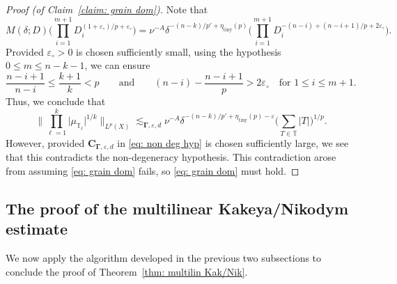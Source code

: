 \documentclass[reqno]{amsart}
\numberwithin{equation}{section}
\newcommand{\T}{\mathbb{T}}
\newcommand{\bC}{\mathbf{C}}
\newcommand{\bdGamma}{\boldsymbol{\Gamma}}
\theoremstyle{plain}
\theoremstyle{definition}
\newcommand{\ttiny}{\mathrm{tiny}}
\begin{document}
\begin{proof}[Proof (of Claim~\ref{claim: grain dom})]
Note that
\begin{equation*}
  M(\delta; D)\big(\prod_{i=1}^{m+1}  D_i^{(1 + \varepsilon_{\circ})/p + \varepsilon_{\circ}}\Big)  =    \nu^{-A} \delta^{-(n-k)/p' + \eta_{\ttiny}(p)}\Big(\prod_{i = 1}^{m+1} D_i^{-(n-i)+(n-i+1)/p + 2\varepsilon_{\circ}} \Big).
\end{equation*}
Provided $\varepsilon_{\circ} > 0$ is chosen sufficiently small, using the hypothesis $0 \leq m \leq n - k - 1$, we can ensure 
\begin{equation*}
  \frac{n-i + 1}{n-i} \leq \frac{k+1}{k} < p \qquad \textrm{and} \qquad (n-i) - \frac{n- i + 1}{p} > 2\varepsilon_{\circ} \quad \textrm{for $1 \leq i \leq m+1$.}  
\end{equation*}
Thus, we conclude that
\begin{equation*}
   \Big\|\prod_{\ell = 1}^k \big| \mu_{\T_{\ell}} \big|^{1/k} \Big\|_{L^p(X)} \lesssim_{\bdGamma,  \varepsilon, d}   \nu^{-A} \delta^{-(n-k)/p' + \eta_{\ttiny}(p) - \varepsilon} \Big(\sum_{T \in \T} |T| \Big)^{1/p}.  
\end{equation*}
However, provided $\bC_{\bdGamma, \varepsilon, d}$ in \eqref{eq: non deg hyp} is chosen sufficiently large, we see that this contradicts the non-degeneracy hypothesis. This contradiction arose from assuming \eqref{eq: grain dom} fails, so \eqref{eq: grain dom} must hold. 
\end{proof}





\subsection{The proof of the multilinear Kakeya/Nikodym estimate} We now apply the algorithm developed in the previous two subsections to conclude the proof of Theorem~\ref{thm: multilin Kak/Nik}. 
\end{document}
